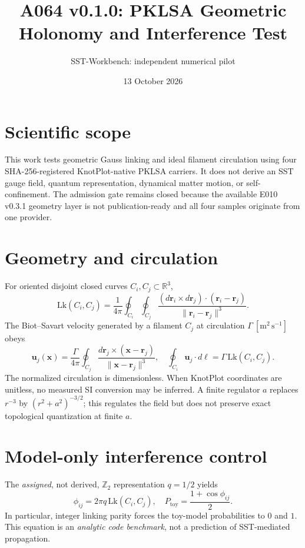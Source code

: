 \documentclass[11pt,a4paper]{article}
\title{A064 v0.1.0: PKLSA Geometric Holonomy and Interference Test}
\author{SST-Workbench: independent numerical pilot}
\date{13 October 2026}
\begin{document}
\maketitle
\section{Scientific scope}
This work tests geometric Gauss linking and ideal filament circulation using four
SHA-256-registered KnotPlot-native PKLSA carriers. It does not derive an SST gauge
field, quantum representation, dynamical matter motion, or self-confinement. The
admission gate remains closed because the available E010 v0.3.1 geometry layer is
not publication-ready and all four samples originate from one provider.
\section{Geometry and circulation}
For oriented disjoint closed curves $C_i,C_j\subset\mathbb R^3$,
\begin{equation}\mathrm{Lk}(C_i,C_j)=\frac{1}{4\pi}
\oint_{C_i}\oint_{C_j}\frac{(d\mathbf r_i\times d\mathbf r_j)
\cdot(\mathbf r_i-\mathbf r_j)}{\lVert\mathbf r_i-\mathbf r_j\rVert^3}.
\end{equation}
The Biot--Savart velocity generated by a filament $C_j$ at circulation
$\Gamma\ [\mathrm{m^2\,s^{-1}}]$ obeys
\begin{equation}\mathbf u_j(\mathbf x)=\frac{\Gamma}{4\pi}
\oint_{C_j}\frac{d\mathbf r_j\times(\mathbf x-\mathbf r_j)}
{\lVert\mathbf x-\mathbf r_j\rVert^3},\quad
\oint_{C_i}\mathbf u_j\cdot d\boldsymbol\ell=\Gamma\,\mathrm{Lk}(C_i,C_j).
\end{equation}
The normalized circulation is dimensionless. When KnotPlot coordinates are
unitless, no measured SI conversion may be inferred. A finite regulator $a$
replaces $r^{-3}$ by $(r^2+a^2)^{-3/2}$; this regulates the field but does not
preserve exact topological quantization at finite $a$.
\section{Model-only interference control}
The \emph{assigned}, not derived, $\mathbb Z_2$ representation $q=1/2$ yields
\begin{equation}\phi_{ij}=2\pi q\,\mathrm{Lk}(C_i,C_j),\quad
P_{\mathrm{toy}}=\frac{1+\cos\phi_{ij}}{2}.
\end{equation}
In particular, integer linking parity forces the toy-model probabilities to
$0$ and $1$. This equation is an \emph{analytic code benchmark}, not a
prediction of SST-mediated propagation.
\end{document}
